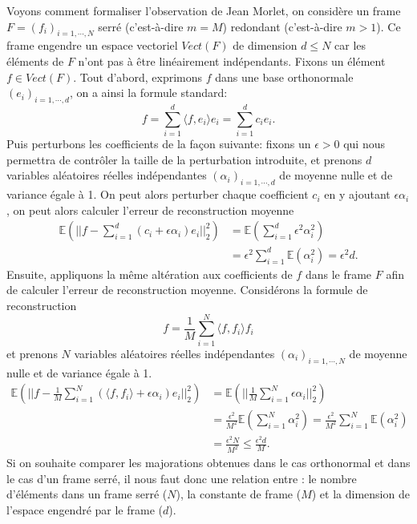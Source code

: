 Voyons comment formaliser l'observation de Jean Morlet, on considère un frame $F=(f_i)_{i=1,\cdots,N}$ serré (c'est-à-dire $m=M$) redondant (c'est-à-dire $m>1$).
Ce frame engendre un espace vectoriel $Vect(F)$ de dimension $d\leq N$ car les éléments de $F$ n'ont pas à être linéairement indépendants.
Fixons un élément $f\in Vect(F)$.
Tout d'abord, exprimons $f$ dans une base orthonormale $(e_i)_{i=1,\cdots, d}$, on a ainsi la formule standard:
\begin{equation*}
	f = \sum_{i=1}^d \langle f, e_i \rangle e_i = \sum_{i=1}^d c_i e_i.
\end{equation*}
Puis perturbons les coefficients de la façon suivante: fixons un $\epsilon >0$ qui nous permettra de contrôler la taille de la perturbation introduite, et prenons $d$ variables aléatoires réelles indépendantes $(\alpha_i)_{i=1,\cdots, d}$ de moyenne nulle et de variance égale à 1.
On peut alors perturber chaque coefficient $c_i$ en y ajoutant $\epsilon \alpha_i$, on peut alors calculer l'erreur de reconstruction moyenne
\begin{align*}
	\mathbb{E}\left(|| f- \sum_{i=1}^d (c_i + \epsilon \alpha_i)e_i||_2^2\right) &= \mathbb{E}\left(\sum_{i=1}^d \epsilon^2 \alpha_i^2\right)\\
		&= \epsilon^2 \sum_{i=1}^d \mathbb{E} (\alpha_i^2) = \epsilon^2 d \label{eq:errorth}.
\end{align*} 
Ensuite, appliquons la même altération aux coefficients de $f$ dans le frame $F$ afin de calculer l'erreur de reconstruction moyenne.
Considérons la formule de reconstruction
\begin{equation*}
	f = \frac{1}{M}\sum_{i=1}^N \langle f, f_i \rangle f_i
\end{equation*}
et prenons $N$ variables aléatoires réelles indépendantes $(\alpha_i)_{i=1, \cdots, N}$  de moyenne nulle et de variance égale à 1.
\begin{align*}
	\mathbb{E}\left(|| f- \frac{1}{M}\sum_{i=1}^N (\langle f, f_i\rangle + \epsilon \alpha_i)e_i||_2^2\right) &= \mathbb{E}\left(||\frac{1}{M} \sum_{i=1}^N \epsilon \alpha_i||_2^2\right)\\
	&= \frac{\epsilon^2}{M^2} \mathbb{E}(\sum_{i=1}^N \alpha_i^2) = \frac{\epsilon^2}{M^2} \sum_{i=1}^N \mathbb{E}(\alpha_i^2) \\
	&= \frac{\epsilon^2 N}{M^2} \leq \frac{\epsilon^2 d}{M}. \label{eq:errframe}%
\end{align*}
Si on souhaite comparer les majorations obtenues dans le cas orthonormal et dans le cas d'un frame serré, il nous faut donc une relation entre : le nombre d'éléments dans un frame serré ($N$), la constante de frame ($M$) et la dimension de l'espace engendré par le frame ($d$).
